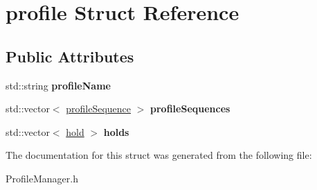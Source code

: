 \hypertarget{structprofile}{\section{profile Struct Reference}
\label{structprofile}
}
\subsection*{Public Attributes}
\begin{DoxyCompactItemize}
\item 
\hypertarget{structprofile_ae5a8115d37d3527b7b20b2b90a5cdaa3}{std\+::string {\bfseries profile\+Name}}\label{structprofile_ae5a8115d37d3527b7b20b2b90a5cdaa3}

\item 
\hypertarget{structprofile_a92cf53f4df6b3e1a1f82f1c020e1049f}{std\+::vector$<$ \hyperlink{structprofile_sequence}{profile\+Sequence} $>$ {\bfseries profile\+Sequences}}\label{structprofile_a92cf53f4df6b3e1a1f82f1c020e1049f}

\item 
\hypertarget{structprofile_af0260fc43229728101d5db86884f54a0}{std\+::vector$<$ \hyperlink{structhold}{hold} $>$ {\bfseries holds}}\label{structprofile_af0260fc43229728101d5db86884f54a0}

\end{DoxyCompactItemize}


The documentation for this struct was generated from the following file\+:\begin{DoxyCompactItemize}
\item 
Profile\+Manager.\+h\end{DoxyCompactItemize}
